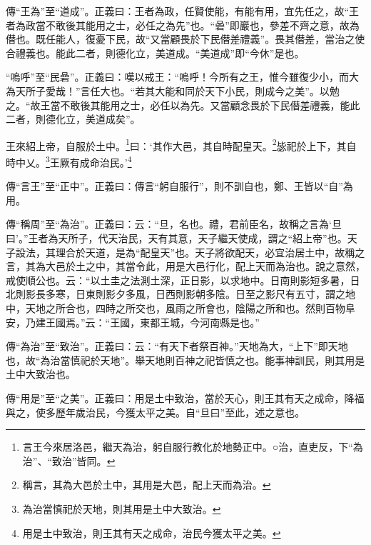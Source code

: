 {\noindent\zhuan{}\fzbyks 傳“王為”至“道成”。正義曰：王者為政，任賢使能，有能有用，宜先任之，故“王者為政當不敢後其能用之士，必任之為先”也。“碞”即巖也，參差不齊之意，故為僣也。既任能人，復憂下民，故“又當顧畏於下民僣差禮義”。畏其僣差，當治之使合禮義也。能此二者，則德化立，美道成。“美道成”即“今休”是也。 \par}

{\noindent\shu{}\fzkt “嗚呼”至“民碞”。正義曰：嘆以戒王：“嗚呼！今所有之王，惟今雖復少小，而大為天所子愛哉！”言任大也。“若其大能和同於天下小民，則成今之美”。以勉之。“故王當不敢後其能用之士，必任以為先。又當顧念畏於下民僣差禮義，能此二者，則德化立，美道成矣”。 \par}

王來紹上帝，自服於土中。\footnote{言王今來居洛邑，繼天為治，躬自服行教化於地勢正中。○治，直吏反，下“為治”、“致治”皆同。}曰：‘其作大邑，其自時配皇天。\footnote{稱言，其為大邑於土中，其用是大邑，配上天而為治。}毖祀於上下，其自時中乂。\footnote{為治當慎祀於天地，則其用是土中大致治。}王厥有成命治民。’\footnote{用是土中致治，則王其有天之成命，治民今獲太平之美。}


{\noindent\zhuan{}\fzbyks 傳“言王”至“正中”。正義曰：傳言“躬自服行”，則不訓自也，鄭、王皆以“自”為用。 \par}

{\noindent\zhuan{}\fzbyks 傳“稱周”至“為治”。正義曰：云：“旦，名也。禮，君前臣名，故稱之言為‘旦曰’。”王者為天所子，代天治民，天有其意，天子繼天使成，謂之“紹上帝”也。天子設法，其理合於天道，是為“配皇天”也。天子將欲配天，必宜治居土中，故稱之言，其為大邑於土之中，其當令此，用是大邑行化，配上天而為治也。說之意然，戒使順公也。云：“以土圭之法測土深，正日影，以求地中。日南則影短多暑，日北則影長多寒，日東則影夕多風，日西則影朝多陰。日至之影尺有五寸，謂之地中，天地之所合也，四時之所交也，風雨之所會也，陰陽之所和也。然則百物阜安，乃建王國焉。”云：“王國，東都王城，今河南縣是也。” \par}

{\noindent\zhuan{}\fzbyks 傳“為治”至“致治”。正義曰：云：“有天下者祭百神。”天地為大，“上下”即天地也，故“為治當慎祀於天地”。舉天地則百神之祀皆慎之也。能事神訓民，則其用是土中大致治也。 \par}

{\noindent\zhuan{}\fzbyks 傳“用是”至“之美”。正義曰：用是土中致治，當於天心，則王其有天之成命，降福與之，使多歷年歲治民，今獲太平之美。自“旦曰”至此，述之意也。 \par}


